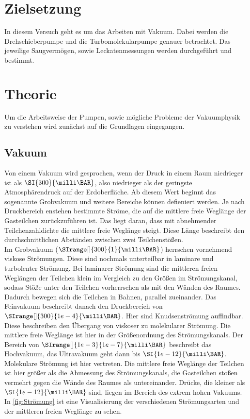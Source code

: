 \section{Zielsetzung}
    In diesem Versuch geht es um das Arbeiten mit Vakuum.
    Dabei werden die Drehschieberpumpe und die Turbomolekularpumpe genauer betrachtet.
    Das jeweilige Saugvermögen, sowie Leckatenmessungen werden durchgeführt und bestimmt.

\section{Theorie}
\label{sec:Theorie}
    Um die Arbeitsweise der Pumpen, sowie mögliche Probleme der Vakuumphysik zu verstehen wird zunächst auf die Grundlagen eingegangen.
    \subsection{Vakuum}
        Von einem Vakuum wird gesprochen, wenn der Druck in einem Raum niedrieger ist als $\SI{300}{\milli\BAR}$, also niedrieger als der geringste Atmosphärendruck auf der Erdoberfläche.
        Ab diesem Wert beginnt das sogenannte Grobvakuum und weitere Bereiche können defieniert werden.
        Je nach Druckbereich enstehen bestimmte Ströme, die auf die mittlere freie Weglänge der Gasteilchen zurückzuführen ist.
        Das liegt daran, dass mit abnehmender Teilchenzahldichte die mittlere freie Weglänge steigt.
        Diese Länge beschreibt den durchschnittlichen Abständen zwischen zwei Teilchenstößen. \\
        \noindent
        Im Grobvakuum ($\SIrange[]{300}{1}{\milli\BAR}$) herrschen vornehmend viskose Strömungen.
        Diese sind nochmals unterteilbar in laminare und turbolenter Strömung.
        Bei laminarer Strömung sind die mittleren freien Weglängen der Teilchen klein im Vergleich zu den Größen im Strömungskanal, sodass Stöße unter den Teilchen vorherrschen als mit den Wänden des Raumes.
        Dadurch bewegen sich die Teilchen in Bahnen, parallel zueinander.
        \noindent
        Das Feinvakuum beschreibt danach den Druckbereich von $\SIrange[]{300}{1e-4}{\milli\BAR}$.
        Hier sind Knudsenströmung auffindbar.
        Diese beschreiben den Übergang von viskoser zu molekularer Strömung.
        Die mittlere freie Weglänge ist hier in der Größenordnung des Strömungskanals.
        \noindent
        Der Bereich von $\SIrange[]{1e-3}{1e-7}{\milli\BAR}$ beschreibt das Hochvakuum, das Ultravakuum geht dann bis $\SI{1e-12}{\milli\BAR}$.
        Molekulare Strömung ist hier vertreten.
        Die mittlere freie Weglänge der Teilchen ist hier größer als die Abmessung des Strömungskanals, die Gasteilchen stoßen vermehrt gegen die Wände des Raumes als untereinander.
        \noindent
        Drücke, die kleiner als $\SI{1e-12}{\milli\BAR}$ sind, liegen im Bereich des extrem hohen Vakuums.
        \noindent
        In \autoref{fig:Strömung} ist eine Visualisierung der verschiedenen Strömungsarten und der mittleren freien Weglänge zu sehen.

